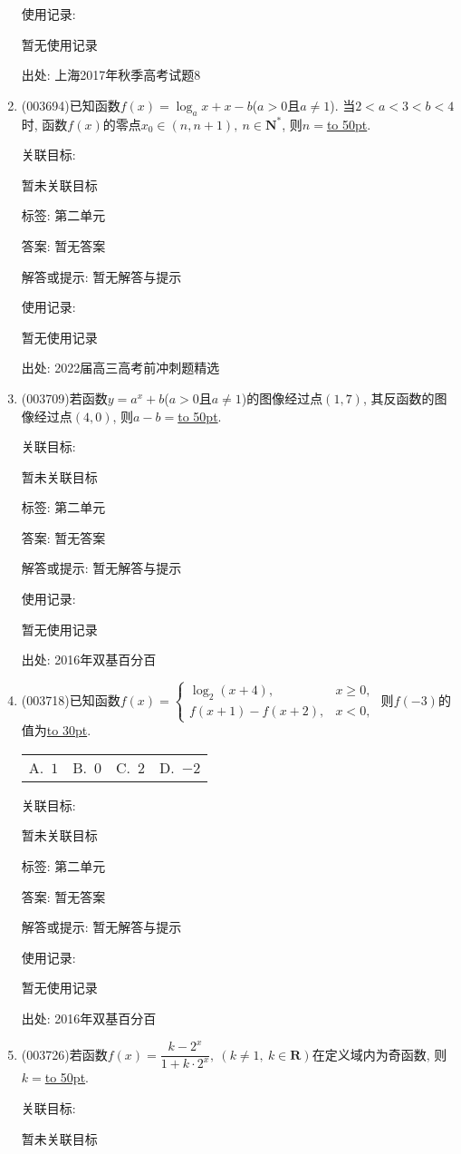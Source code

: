 \documentclass[10pt,a4paper]{article}
\newcommand{\blank}[1]{\underline{\hbox to #1pt{}}}
\newcommand{\fourch}[4]{\par\begin{tabular}{p{.23\textwidth}p{.23\textwidth}p{.23\textwidth}p{.23\textwidth}}
A.~#1 &B.~#2& C.~#3& D.~#4
\end{tabular}}
\begin{document}
\begin{enumerate}[1.]
使用记录:

暂无使用记录


出处: 上海2017年秋季高考试题8
\item { (003694)}已知函数$f(x)=\log_a x+x-b$($a>0$且$a\ne 1$). 当$2<a<3<b<4$时, 函数$f(x)$的零点$x_0\in (n,n+1), \ n\in \mathbf{N}^*$, 则$n=$\blank{50}.


关联目标:

暂未关联目标



标签: 第二单元

答案: 暂无答案

解答或提示: 暂无解答与提示

使用记录:

暂无使用记录


出处: 2022届高三高考前冲刺题精选
\item { (003709)}若函数$y=a^x+b$($a>0$且$a\ne 1$)的图像经过点$(1,7)$, 其反函数的图像经过点$(4,0)$, 则$a-b=$\blank{50}.


关联目标:

暂未关联目标



标签: 第二单元

答案: 暂无答案

解答或提示: 暂无解答与提示

使用记录:

暂无使用记录


出处: 2016年双基百分百
\item { (003718)}已知函数$f(x)=\begin{cases}
\log_2(x+4), & x\ge 0,\\f(x+1)-f(x+2), & x<0,\end{cases}$ 则$f(-3)$的值为\blank{30}.
\fourch{$1$}{$0$}{$2$}{$-2$}


关联目标:

暂未关联目标



标签: 第二单元

答案: 暂无答案

解答或提示: 暂无解答与提示

使用记录:

暂无使用记录


出处: 2016年双基百分百
\item { (003726)}若函数$f(x)=\dfrac{k-2^x}{1+k\cdot 2^x}, \ (k\ne 1, \ k\in \mathbf{R})$在定义域内为奇函数, 则$k=$\blank{50}.


关联目标:

暂未关联目标




\end{enumerate}
\end{document}
